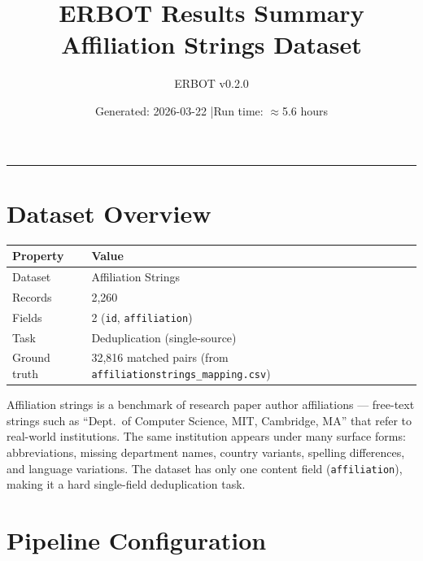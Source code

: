 \documentclass[11pt, a4paper]{article}
\title{\textbf{ERBOT Results Summary}\\[4pt]
       \large Affiliation Strings Dataset}
\author{ERBOT v0.2.0}
\date{Generated: 2026-03-22 \quad|\quad Run time: $\approx$5.6 hours}
\begin{document}
\maketitle
\tableofcontents
\vspace{1em}
\hrule
\vspace{1em}

\section{Dataset Overview}

\begin{table}[h!]
\centering
\begin{tabular}{ll}
\toprule
\textbf{Property} & \textbf{Value} \\
\midrule
Dataset      & Affiliation Strings \\
Records      & 2,260 \\
Fields       & 2 (\texttt{id}, \texttt{affiliation}) \\
Task         & Deduplication (single-source) \\
Ground truth & 32,816 matched pairs (from \texttt{affiliationstrings\_mapping.csv}) \\
\bottomrule
\end{tabular}
\end{table}

Affiliation strings is a benchmark of research paper author affiliations --- free-text strings
such as ``Dept.\ of Computer Science, MIT, Cambridge, MA'' that refer to real-world institutions.
The same institution appears under many surface forms: abbreviations, missing department names,
country variants, spelling differences, and language variations. The dataset has only one content
field (\texttt{affiliation}), making it a hard single-field deduplication task.

\section{Pipeline Configuration}
\end{document}
